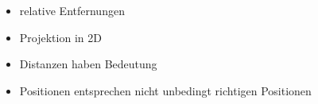 \begin{itemize}
	\item relative Entfernungen
	\item Projektion in 2D
	\item Distanzen haben Bedeutung
	\item Positionen entsprechen nicht unbedingt richtigen Positionen
\end{itemize}